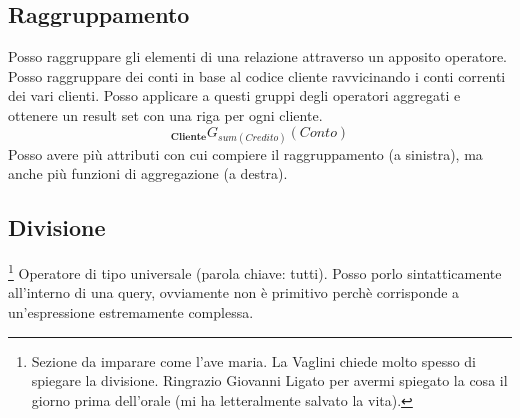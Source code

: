 \subsection{Raggruppamento}
Posso raggruppare gli elementi di una relazione attraverso un apposito operatore. Posso raggruppare dei conti in base al codice cliente ravvicinando i conti correnti dei vari clienti. Posso applicare a questi gruppi degli operatori aggregati e ottenere un result set con una riga per ogni cliente.
\[_\mathbf{Cliente}G_{sum(Credito)}(Conto)\]
Posso avere più attributi con cui compiere il raggruppamento (a sinistra), ma anche più funzioni di aggregazione (a destra).
\subsection{Divisione}\footnote{Sezione da imparare come l'ave maria. La Vaglini chiede molto spesso di spiegare la divisione. Ringrazio Giovanni Ligato per avermi spiegato la cosa il giorno prima dell'orale (mi ha letteralmente salvato la vita).}
Operatore di tipo universale (parola chiave: tutti). Posso porlo sintatticamente all'interno di una query, ovviamente non è primitivo perchè corrisponde a un'espressione estremamente complessa.
